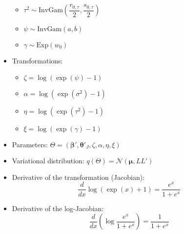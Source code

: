 \documentclass[review]{elsarticle}
\begin{document}
\begin{itemize}
\begin{itemize}
    \item $\tau^{2} \sim \mathrm{InvGam}\left(\dfrac{r_{0,\tau}}{2},\dfrac{s_{0,\tau}}{2}\right)$
    \item $\psi \sim \mathrm{InvGam}(a,b)$
    \item $\gamma\sim\mathrm{Exp}\left(w_{0}\right)$
  \end{itemize}
  \item Transformations:
  \begin{itemize}
    \item $\zeta = \log(\exp(\psi)-1)$
    \item $\alpha=\log(\exp(\sigma^{2})-1)$
    \item $\eta = \log(\exp(\tau^{2})-1)$
    \item $\xi = \log(\exp(\gamma)-1)$
  \end{itemize}
  \item Parameters: $\Theta = \left(\bm{\beta}',\bm{\theta}'_{J},\zeta,\alpha,\eta,\xi\right)$
  \item Variational distribution: $q(\Theta)=\mathcal{N}(\bm{\mu},LL')$
  \item Derivative of the transformation (Jacobian):
  \begin{equation}
    \dfrac{d}{dx}\log(\exp(x)+1) = \dfrac{e^{x}}{1+e^{x}}
  \end{equation}
  \item Derivative of the log-Jacobian:
  \begin{equation}
  \dfrac{d}{dx}\left(\log\dfrac{e^{x}}{1+e^{x}}\right)=\dfrac{1}{1+e^{x}}
  \end{equation}
\end{itemize}
\end{document}
